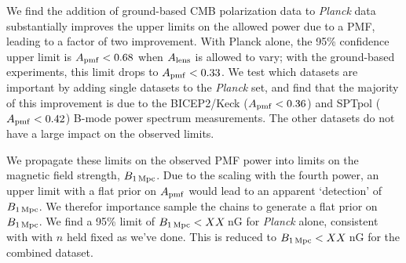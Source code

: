 \documentclass[preprint]{emulateapj}
\newcommand{\apmf}{\ensuremath{A_{\rm pmf}}}
\newcommand{\bpmf}{\ensuremath{B_{\rm 1\,Mpc}}}
\newcommand{\alens}{\ensuremath{A_{\rm lens}}}
\newcommand{\planck}{{\sl Planck}}
\newcommand{\bicepkeck}{BICEP2/Keck}
\newcommand{\sptpol}{SPTpol}
\begin{document}
We find the addition of ground-based CMB polarization data to \planck{} data substantially improves the upper limits on the allowed power due to a PMF, leading to a factor of two improvement. 
With Planck alone, the 95\% confidence upper limit is $\apmf <  0.68$ when $\alens$ is allowed to vary; with the ground-based experiments, this limit drops to $\apmf <  0.33$. 
We test which datasets are important by adding single datasets to the \planck{} set, and find that the majority of this improvement is due to the \bicepkeck{} ($\apmf <  0.36$) and \sptpol{} ($\apmf <  0.42$) B-mode power spectrum measurements. 
The other datasets do not have a large impact on the observed limits. 

We propagate these limits on the observed PMF power into limits on the magnetic field strength, \bpmf. 
Due to the scaling with the fourth power, an upper limit with a flat prior on \apmf{} would lead to an apparent `detection' of \bpmf. 
We therefor importance sample the chains to generate a flat prior on \bpmf. 
We find a 95\% limit of $\bpmf < XX$\,nG for \planck{} alone, consistent with \citep{planckpmf} with $n$ held fixed as we've done. 
This is reduced to $\bpmf < XX$\,nG for the combined dataset. 
\end{document}
